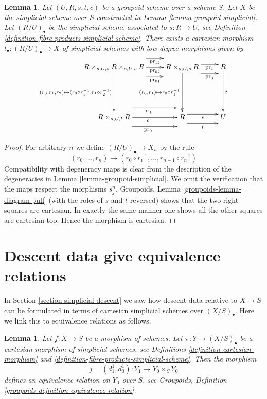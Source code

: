 \documentclass{stacks-project}
\theoremstyle{plain}
\newtheorem{lemma}[subsection]{Lemma}
\theoremstyle{definition}
\theoremstyle{remark}
\numberwithin{equation}{subsection}
\begin{document}
\begin{lemma}
\label{lemma-quasi-coherent-groupoid-R-cartesian}
Let $(U, R, s, t, c)$ be a groupoid scheme over a scheme $S$.
Let $X$ be the simplicial scheme over $S$ constructed
in Lemma \ref{lemma-groupoid-simplicial}.
Let $(R/U)_\bullet$ be the simplicial
scheme associated to $s : R \to U$, see
Definition \ref{definition-fibre-products-simplicial-scheme}.
There exists a cartesian morphism $t_\bullet : (R/U)_\bullet \to X$
of simplicial schemes with low degree morphisms given by
$$
\xymatrix{
R \times_{s, U, s} R \times_{s, U, s} R
\ar@<3ex>[r]_-{\text{pr}_{12}}
\ar@<0ex>[r]_-{\text{pr}_{02}}
\ar@<-3ex>[r]_-{\text{pr}_{01}}
\ar[dd]_{(r_0, r_1, r_2) \mapsto (r_0 \circ r_1^{-1}, r_1 \circ r_2^{-1})} &
R \times_{s, U, s} R
\ar@<1ex>[r]_-{\text{pr}_1} \ar@<-2ex>[r]_-{\text{pr}_0}
\ar[dd]_{(r_0, r_1) \mapsto r_0 \circ r_1^{-1}} &
R \ar[dd]^t
\\
\\
R \times_{s, U, t} R
\ar@<3ex>[r]_{\text{pr}_1}
\ar@<0ex>[r]_c
\ar@<-3ex>[r]_{\text{pr}_0} &
R \ar@<1ex>[r]_s \ar@<-2ex>[r]_t &
U
}
$$
\end{lemma}

\begin{proof}
For arbitrary $n$ we define $(R/U)_\bullet \to X_n$ by the rule
$$
(r_0, \ldots, r_n)
\longrightarrow
(r_0 \circ r_1^{-1}, \ldots, r_{n - 1} \circ r_n^{-1})
$$
Compatibility with degeneracy maps is clear from the description of the
degeneracies in Lemma \ref{lemma-groupoid-simplicial}.
We omit the verification that the maps respect the morphisms $s^n_j$.
Groupoids, Lemma \ref{groupoids-lemma-diagram-pull}
(with the roles of $s$ and $t$ reversed)
shows that the two right squares are cartesian. In exactly the same manner
one shows all the other squares are cartesian too. Hence
the morphism is cartesian.
\end{proof}




\section{Descent data give equivalence relations}
\label{section-equivalence-relation}

\noindent
In Section \ref{section-simplicial-descent} we saw how descent data relative to
$X \to S$ can be formulated in terms of cartesian simplicial
schemes over $(X/S)_\bullet$. Here we link this to equivalence
relations as follows.

\begin{lemma}
\label{lemma-equivalence-relation}
Let $f : X \to S$ be a morphism of schemes.
Let $\pi : Y \to (X/S)_\bullet$ be a cartesian morphism of simplicial
schemes, see Definitions \ref{definition-cartesian-morphism} and
\ref{definition-fibre-products-simplicial-scheme}.
Then the morphism
$$
j = (d^1_1, d^1_0) : Y_1 \to Y_0 \times_S Y_0
$$
defines an equivalence relation on $Y_0$ over $S$,
see Groupoids, Definition \ref{groupoids-definition-equivalence-relation}.
\end{lemma}
\end{document}
